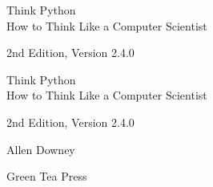 \documentclass[10pt]{book}
\newcommand{\theversion}{2nd Edition, Version 2.4.0}
\newcommand{\thedate}{}
\begin{document}
\begin{latexonly}

\renewcommand{\blankpage}{\thispagestyle{empty} \quad \newpage}



\thispagestyle{empty}

\begin{flushright}
\vspace*{2.0in}

\begin{spacing}{3}
{\huge Think Python}\\
{\Large How to Think Like a Computer Scientist}
\end{spacing}

\vspace{0.25in}

\theversion

\thedate

\vfill

\end{flushright}


\blankpage
\blankpage

\pagebreak
\thispagestyle{empty}

\begin{flushright}
\vspace*{2.0in}

\begin{spacing}{3}
{\huge Think Python}\\
{\Large How to Think Like a Computer Scientist}
\end{spacing}

\vspace{0.25in}

\theversion

\thedate

\vspace{1in}


{\Large
Allen Downey\\
}


\vspace{0.5in}

{\Large Green Tea Press}


\end{flushright}
\end{latexonly}
\end{document}
